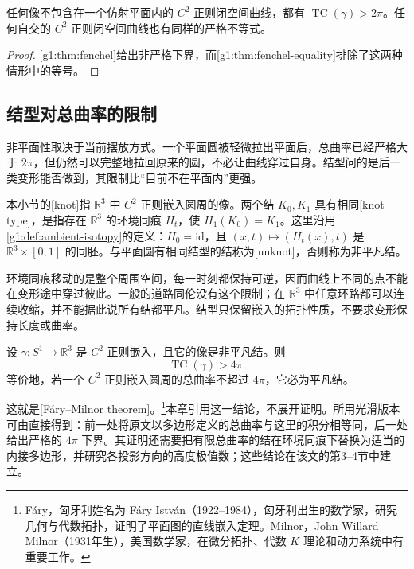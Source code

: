 \begin{corollary}\label{g1:cor:nonplanar-total-curvature}
	任何像不包含在一个仿射平面内的 \(C^2\) 正则闭空间曲线，都有 \(\operatorname{TC}(\gamma)>2\pi\)。任何自交的 \(C^2\) 正则闭空间曲线也有同样的严格不等式。
\end{corollary}

\begin{proof}
	\cref{g1:thm:fenchel}给出非严格下界，而\cref{g1:thm:fenchel-equality}排除了这两种情形中的等号。
\end{proof}

\subsection{结型对总曲率的限制}
\label{g1:subsec:0704:04}

非平面性取决于当前摆放方式。一个平面圆被轻微拉出平面后，总曲率已经严格大于 \(2\pi\)，但仍然可以完整地拉回原来的圆，不必让曲线穿过自身。结型问的是后一类变形能否做到，其限制比“目前不在平面内”更强。

\begin{definition}\label{g1:def:knot-unknot}
	本小节的[knot]指 \(\mathbb R^3\) 中 \(C^2\) 正则嵌入圆周的像。两个结 \(K_0,K_1\) 具有相同[knot type]，是指存在 \(\mathbb R^3\) 的环境同痕 \(H_t\)，使 \(H_1(K_0)=K_1\)。这里沿用\cref{g1:def:ambient-isotopy}的定义：\(H_0=\mathrm{id}\)，且 \((x,t)\mapsto(H_t(x),t)\) 是 \(\mathbb R^3\times[0,1]\) 的同胚。与平面圆有相同结型的结称为[unknot]，否则称为非平凡结。
\end{definition}

环境同痕移动的是整个周围空间，每一时刻都保持可逆，因而曲线上不同的点不能在变形途中穿过彼此。一般的道路同伦没有这个限制；在 \(\mathbb R^3\) 中任意环路都可以连续收缩，并不能据此说所有结都平凡。结型只保留嵌入的拓扑性质，不要求变形保持长度或曲率。

\begin{theorem}\label{g1:thm:fary-milnor}
	设 \(\gamma:S^1\to\mathbb R^3\) 是 \(C^2\) 正则嵌入，且它的像是非平凡结。则
	\[
		\operatorname{TC}(\gamma)>4\pi.
	\]
	等价地，若一个 \(C^2\) 正则嵌入圆周的总曲率不超过 \(4\pi\)，它必为平凡结。
\end{theorem}

这就是[Fáry--Milnor theorem]。\footnote{Fáry，匈牙利姓名为 Fáry István（1922--1984），匈牙利出生的数学家，研究几何与代数拓扑，证明了平面图的直线嵌入定理。Milnor，John Willard Milnor（1931年生），美国数学家，在微分拓扑、代数 \(K\) 理论和动力系统中有重要工作。}本章引用这一结论，不展开证明。所用光滑版本可由\cite[定理2.2; 推论4.6]{Milnor1950}直接得到：前一处将原文以多边形定义的总曲率与这里的积分相等同，后一处给出严格的 \(4\pi\) 下界。其证明还需要把有限总曲率的结在环境同痕下替换为适当的内接多边形，并研究各投影方向的高度极值数；这些结论在该文的第3--4节中建立。

